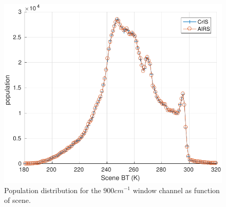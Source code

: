 \documentclass[twocolumn,10pt]{article}
\begin{document}
\begin{figure}[htb]
\centering
\includegraphics[width=\linewidth]{./figs/AC_jplSNO_900wn_population_vs_scene.pdf}
\caption{\label{fig:orgparagraph11}
  Population distribution for the $900 cm^{-1}$ window channel as function of scene.}
\label{fig:Y2}
\end{figure}



\end{document}
